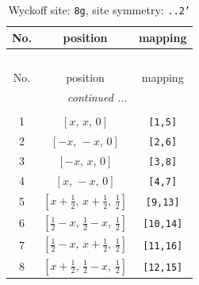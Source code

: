 \documentclass[fleqn,8pt]{jsarticle}
\begin{document}
\renewcommand{\arraystretch}{1.2}
\begin{longtable}{ccc}
\caption{Wyckoff site: {\tt 8g}, site symmetry: {\tt ..2'}}
 \\
 \hline \hline
No. & position & mapping \\ \hline \endfirsthead

\multicolumn{2}{l}{\tablename\ \thetable{}} \\
 \hline \hline
No. & position & mapping \\ \hline \endhead

 \hline \hline
\multicolumn{2}{r}{\footnotesize\it continued ...} \\ \endfoot

 \hline \hline
\multicolumn{2}{r}{} \\ \endlastfoot

1 & $\left[ x,\, x,\, 0 \right]$ & {\tt [1,5]} \\ \hline
2 & $\left[ - x,\, - x,\, 0 \right]$ & {\tt [2,6]} \\ \hline
3 & $\left[ - x,\, x,\, 0 \right]$ & {\tt [3,8]} \\ \hline
4 & $\left[ x,\, - x,\, 0 \right]$ & {\tt [4,7]} \\ \hline
5 & $\left[ x + \frac{1}{2},\, x + \frac{1}{2},\, \frac{1}{2} \right]$ & {\tt [9,13]} \\ \hline
6 & $\left[ \frac{1}{2} - x,\, \frac{1}{2} - x,\, \frac{1}{2} \right]$ & {\tt [10,14]} \\ \hline
7 & $\left[ \frac{1}{2} - x,\, x + \frac{1}{2},\, \frac{1}{2} \right]$ & {\tt [11,16]} \\ \hline
8 & $\left[ x + \frac{1}{2},\, \frac{1}{2} - x,\, \frac{1}{2} \right]$ & {\tt [12,15]} \\
\end{longtable}
\renewcommand{\arraystretch}{1.2}
\end{document}

